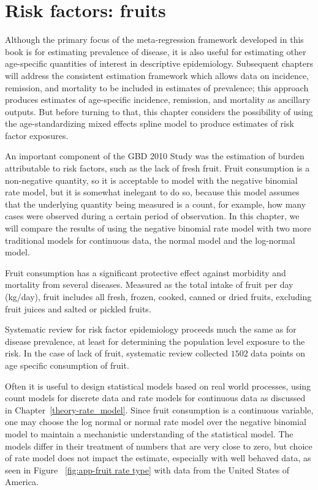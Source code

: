\chapter{Risk factors: fruits}
\label{applications-log_normal}

Although the primary focus of the meta-regression framework developed
in this book is for estimating prevalence of disease, it is also
useful for estimating other age-specific quantities of interest in
descriptive epidemiology.  Subsequent chapters will address the
consistent estimation framework which allows data on incidence,
remission, and mortality to be included in estimates of prevalence;
this approach produces estimates of age-specific incidence, remission,
and mortality as ancillary outputs.  But before turning to that,
this chapter considers the possibility of using the
age-standardizing mixed effects spline model to produce estimates of
risk factor exposures.  

An important component of the GBD 2010 Study
was the estimation of burden attributable to risk factors, such as 
the lack of fresh fruit.  Fruit consumption is a non-negative 
quantity, so it is acceptable to model
with the negative binomial rate model, but it is somewhat inelegant to
do so, because this model assumes that the underlying quantity being
measured is a count, for example, how many cases were observed during a
certain period of observation.  In this chapter, we will compare the results of
using the negative binomial rate model with two more traditional
models for continuous data, the normal model and the log-normal model.

Fruit consumption has a significant protective
effect against morbidity and mortality from several diseases.  
Measured as the total intake of fruit per day (kg/day), fruit
includes all fresh, frozen, cooked, canned or dried fruits, excluding
fruit juices and salted or pickled fruits. \cite{he_increased_2007,
  boeing_intake_2006}

Systematic review for
risk factor epidemiology proceeds much the same as for disease
prevalence, at least for determining the population level exposure to
the risk.  In the case of lack of fruit, systematic review collected
$1502$ data points on age specific consumption of fruit.

Often it is useful to design statistical models based on real world
processes, using count models for discrete data and rate models for
continuous data as discussed in Chapter~\ref{theory-rate_model}.
Since fruit consumption is a continuous variable, one may choose the
log normal or normal rate model over the negative binomial model to
maintain a mechanistic understanding of the statistical model.  The
models differ in their treatment of numbers that are very close to
zero, but choice of rate model does not impact the estimate,
especially with well behaved data, as seen in Figure
~\ref{fig:app-fruit rate type} with data from the United States of 
America.

